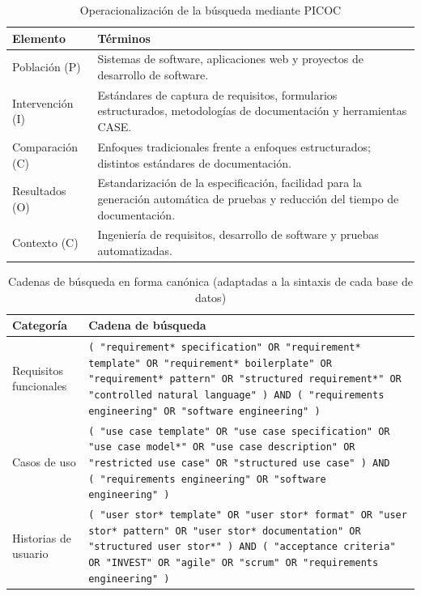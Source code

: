 \documentclass[10pt,journal,twoside,letterpaper]{IEEEtran}
\begin{document}
	\begin{table}[!t]
		\caption{Operacionalización de la búsqueda mediante PICOC}
		\label{tab:picoc}
		\centering
		\small
		\begin{tabular}{@{}p{}p{}@{}}
			\toprule
			\textbf{Elemento} & \textbf{Términos} \\
			\midrule
			Población (P)   & Sistemas de software, aplicaciones web y proyectos de desarrollo de software. \\
			Intervención (I)& Estándares de captura de requisitos, formularios estructurados, metodologías de documentación y herramientas CASE. \\
			Comparación (C) & Enfoques tradicionales frente a enfoques estructurados; distintos estándares de documentación. \\
			Resultados (O)  & Estandarización de la especificación, facilidad para la generación automática de pruebas y reducción del tiempo de documentación. \\
			Contexto (C)    & Ingeniería de requisitos, desarrollo de software y pruebas automatizadas. \\
			\bottomrule
		\end{tabular}
	\end{table}
	
	\begin{table}[!t]
		\caption{Cadenas de búsqueda en forma canónica (adaptadas a la sintaxis de cada base de datos)}
		\label{tab:cadenas}
		\centering
		\footnotesize
		\begin{tabular}{@{}p{}p{}@{}}
			\toprule
			\textbf{Categoría} & \textbf{Cadena de búsqueda} \\
			\midrule
			Requisitos funcionales & \texttt{(\,"requirement* specification" OR "requirement* template" OR "requirement* boilerplate" OR "requirement* pattern" OR "structured requirement*" OR "controlled natural language"\,) AND (\,"requirements engineering" OR "software engineering"\,)} \\
			\addlinespace
			Casos de uso & \texttt{(\,"use case template" OR "use case specification" OR "use case model*" OR "use case description" OR "restricted use case" OR "structured use case"\,) AND (\,"requirements engineering" OR "software engineering"\,)} \\
			\addlinespace
			Historias de usuario & \texttt{(\,"user stor* template" OR "user stor* format" OR "user stor* pattern" OR "user stor* documentation" OR "structured user stor*"\,) AND (\,"acceptance criteria" OR "INVEST" OR "agile" OR "scrum" OR "requirements engineering"\,)} \\
			\bottomrule
		\end{tabular}
	\end{table}
	
\end{document}

